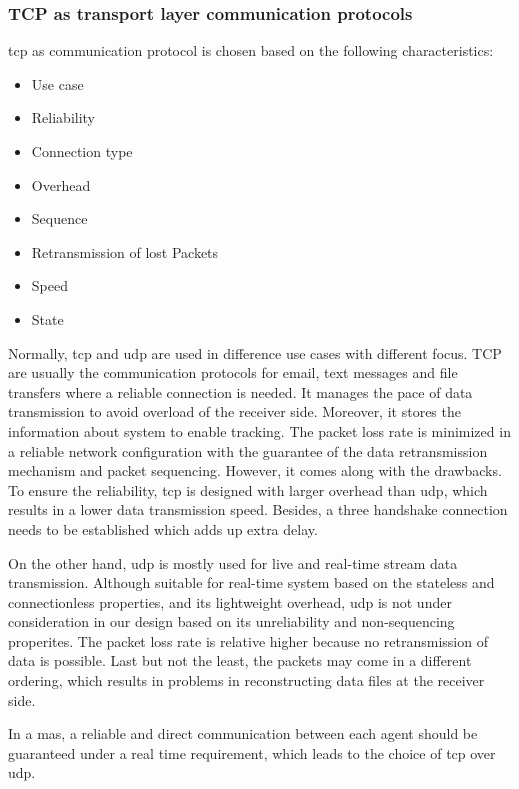 \subsubsection{TCP as transport layer communication protocols}
\gls{tcp} as communication protocol is chosen based on the following characteristics: 
\begin{itemize}
    \item Use case
    \item Reliability
    \item Connection type
    \item Overhead 
    \item Sequence
    \item Retransmission of lost Packets
    \item Speed
    \item State
\end{itemize}
Normally, \gls{tcp} and \gls{udp} are used in difference use cases with different focus. 
TCP are usually the communication protocols for email, text messages and file transfers where a 
reliable connection is needed. It manages the pace of data transmission to avoid overload of 
the receiver side. Moreover, it stores the information about system to enable tracking. The 
packet loss rate is minimized in a reliable network configuration with the guarantee of the 
data retransmission mechanism and packet sequencing. However, it comes along with the 
drawbacks. To ensure the 
reliability, \gls{tcp} is designed with larger overhead than \gls{udp}, which results in a 
lower data transmission speed. Besides, a three handshake connection needs to be established 
which adds up extra delay. 


On the other hand, \gls{udp} is mostly used for live and real-time stream data transmission. 
Although suitable for real-time system based on the stateless and connectionless 
properties, and its lightweight overhead, \gls{udp} is not under consideration in our 
design based on its unreliability and non-sequencing properites. The packet loss rate is 
relative higher because no retransmission of data is possible. Last but not the least, 
the packets may come in a different ordering, which results in problems in reconstructing 
data files at the receiver side.  

In a \gls{mas}, a reliable and direct communication between each agent should be 
guaranteed under a real time requirement, 
which leads to the choice of \gls{tcp} over \gls{udp}. 
 


